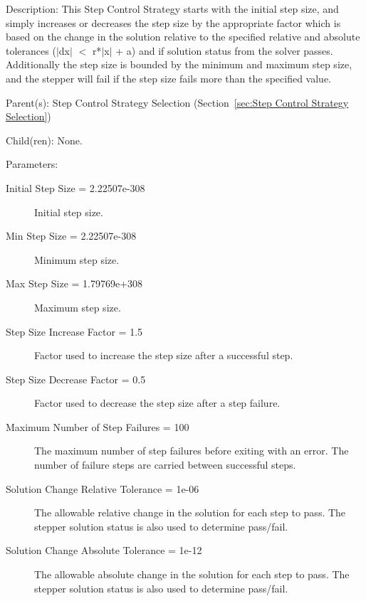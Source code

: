 \begin{list}{}
  {\setlength{\leftmargin}{1.0in}
   \setlength{\labelwidth}{0.75in}
   \setlength{\labelsep}{0.125in}}
  \item[Description:]
    This Step Control Strategy starts with the initial step size, and simply increases or decreases the step size by the appropriate factor which is based on the change in the solution relative to the specified relative and absolute tolerances ($|$dx$|$ $<$ r*$|$x$|$ + a) and if solution status from the solver passes.  Additionally the step size is bounded by the minimum and maximum step size, and the stepper will fail if the step size fails more than the specified value.
  \item[Parent(s):]
    Step Control Strategy Selection (Section~\ref{sec:Step Control Strategy Selection})
  \item[Child(ren):]
    None. 
  \item[Parameters:]
    \begin{description}
      \item[Initial Step Size = 2.22507e-308] 
Initial step size.
      \item[Min Step Size = 2.22507e-308] 
Minimum step size.
      \item[Max Step Size = 1.79769e+308] 
Maximum step size.
      \item[Step Size Increase Factor = 1.5] 
Factor used to increase the step size after a successful step.
      \item[Step Size Decrease Factor = 0.5] 
Factor used to decrease the step size after a step failure.
      \item[Maximum Number of Step Failures = 100] 
The maximum number of step failures before exiting with an error.  The number of failure steps are carried between successful steps.
      \item[Solution Change Relative Tolerance = 1e-06] 
The allowable relative change in the solution for each step to pass.  The stepper solution status is also used to determine pass/fail.
      \item[Solution Change Absolute Tolerance = 1e-12] 
The allowable absolute change in the solution for each step to pass.  The stepper solution status is also used to determine pass/fail.
\end{description}


\end{list}

